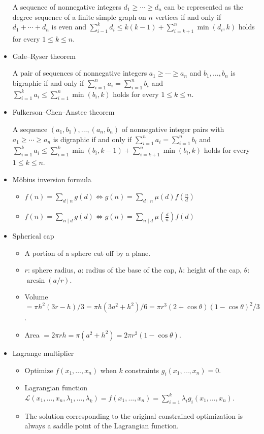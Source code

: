 \begin{itemize}
A sequence of nonnegative integers $d_1\ge\cdots\ge d_n$ can be represented as the degree sequence of a finite simple graph on $n$ vertices if and only if $d_1+\cdots+d_n$ is even and $\displaystyle\sum_{i-1}^kd_i\le k(k-1)+\displaystyle\sum_{i=k+1}^n\min(d_i,k)$ holds for every $1\le k\le n$.

\item Gale–Ryser theorem

A pair of sequences of nonnegative integers $a_1\ge\cdots\ge a_n$ and $b_1,\ldots,b_n$ is bigraphic if and only if $\displaystyle\sum_{i=1}^n a_i=\displaystyle\sum_{i=1}^n b_i$ and $\displaystyle\sum_{i=1}^k a_i\le \displaystyle\sum_{i=1}^n\min(b_i,k)$ holds for every $1\le k\le n$.

\item Fulkerson–Chen–Anstee theorem

A sequence $(a_1,b_1),\ldots,(a_n,b_n)$ of nonnegative integer pairs with $a_1\ge\cdots\ge a_n$ is digraphic if and only if $\displaystyle\sum_{i=1}^n a_i=\displaystyle\sum_{i=1}^n b_i$ and $\displaystyle\sum_{i=1}^k a_i\le \displaystyle\sum_{i=1}^k\min(b_i,k-1)+\displaystyle\sum_{i=k+1}^n\min(b_i,k)$ holds for every $1\le k\le n$.

\item Möbius inversion formula

\begin{itemize}
    \itemsep-0.5em
  \item $f(n)=\sum_{d\mid n}g(d)\Leftrightarrow g(n)=\sum_{d\mid n}\mu(d)f(\frac{n}{d})$
  \item $f(n)=\sum_{n\mid d}g(d)\Leftrightarrow g(n)=\sum_{n\mid d}\mu(\frac{d}{n})f(d)$
\end{itemize}

\item Spherical cap

\begin{itemize}
    \itemsep-0.5em
  \item A portion of a sphere cut off by a plane.
  \item $r$: sphere radius, $a$: radius of the base of the cap, $h$: height of the cap, $\theta$: $\arcsin(a/r)$.
  \item Volume $=\pi h^2(3r-h)/3=\pi h(3a^2+h^2)/6=\pi r^3(2+\cos\theta)(1-\cos\theta)^2/3$.
  \item Area $=2\pi rh=\pi(a^2+h^2)=2\pi r^2(1-\cos\theta)$.
\end{itemize}

\item Lagrange multiplier

\begin{itemize}
    \itemsep-0.5em
  \item Optimize $f(x_1, \ldots, x_n)$ when $k$ constraints $g_i(x_1, \ldots, x_n)=0$.
  \item Lagrangian function $\mathcal{L}(x_1, \ldots, x_n, \lambda_1, \ldots, \lambda_k) = f(x_1, \ldots, x_n) = \sum^{k}_{i=1}\lambda_i g_i(x_1, \ldots, x_n)$.
  \item The solution corresponding to the original constrained optimization is always a saddle point of the Lagrangian function.
\end{itemize}


\end{itemize}

